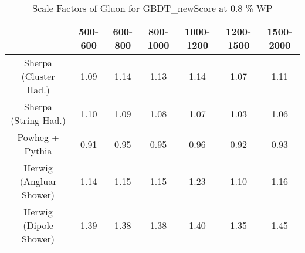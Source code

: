 \begin{table}
\centering
\caption{Scale Factors of Gluon for GBDT_newScore at 0.8 \% WP}
\label{tab:SF_MC_GBDT_newScore_0.8_Gluon}
\begin{tabular}{ccccccc}
\toprule
{} &  500-600 &  600-800 &  800-1000 &  1000-1200 &  1200-1500 &  1500-2000 \\
\midrule
Sherpa (Cluster Had.)   &     1.09 &     1.14 &      1.13 &       1.14 &       1.07 &       1.11 \\
Sherpa (String Had.)    &     1.10 &     1.09 &      1.08 &       1.07 &       1.03 &       1.06 \\
Powheg + Pythia         &     0.91 &     0.95 &      0.95 &       0.96 &       0.92 &       0.93 \\
Herwig (Angluar Shower) &     1.14 &     1.15 &      1.15 &       1.23 &       1.10 &       1.16 \\
Herwig (Dipole Shower)  &     1.39 &     1.38 &      1.38 &       1.40 &       1.35 &       1.45 \\
\bottomrule
\end{tabular}
\end{table}
